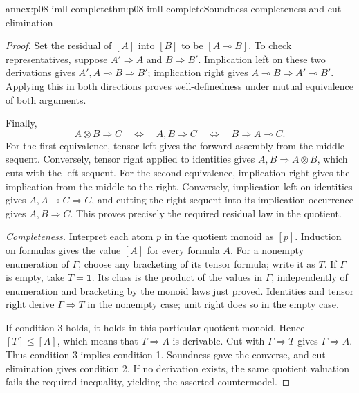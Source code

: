 \begin{annexitem}{annex:p08-imll-complete}{thm:p08-imll-complete}{Soundness completeness and cut elimination}
\begin{proof}
Set the residual of \([A]\) into \([B]\) to be
\([A\multimap B]\).
To check representatives, suppose \(A'\Rightarrow A\) and
\(B\Rightarrow B'\). Implication left on these two derivations gives
\(A',A\multimap B\Rightarrow B'\); implication right gives
\(A\multimap B\Rightarrow A'\multimap B'\).
Applying this in both directions proves well-definedness under
mutual equivalence of both arguments.

Finally,
\[
 A\otimes B\Rightarrow C
 \quad\Longleftrightarrow\quad
 A,B\Rightarrow C
 \quad\Longleftrightarrow\quad
 B\Rightarrow A\multimap C.
\]
For the first equivalence, tensor left gives the forward
assembly from the middle sequent. Conversely, tensor right applied
to identities gives \(A,B\Rightarrow A\otimes B\), which cuts
with the left sequent. For the second equivalence, implication
right gives the implication from the middle to the right.
Conversely, implication left on identities gives
\(A,A\multimap C\Rightarrow C\), and cutting the right sequent
into its implication occurrence gives \(A,B\Rightarrow C\).
This proves precisely the required residual law in the quotient.

\emph{Completeness.}
Interpret each atom \(p\) in the quotient monoid as \([p]\).
Induction on formulas gives the value \([A]\) for every formula \(A\).
For a nonempty enumeration of \(\Gamma\), choose any bracketing of
its tensor formula; write it as \(T\). If \(\Gamma\) is empty,
take \(T=\mathbf1\).
Its class is the product of the values in \(\Gamma\), independently
of enumeration and bracketing by the monoid laws just proved.
Identities and tensor right derive \(\Gamma\Rightarrow T\)
in the nonempty case; unit right does so in the empty case.

If condition 3 holds, it holds in this particular quotient monoid.
Hence \([T]\leq[A]\), which means that \(T\Rightarrow A\) is
derivable. Cut with \(\Gamma\Rightarrow T\) gives
\(\Gamma\Rightarrow A\). Thus condition 3 implies condition 1.
Soundness gave the converse, and cut elimination gives condition 2.
If no derivation exists, the same quotient valuation fails the
required inequality, yielding the asserted countermodel.
\end{proof}
\end{annexitem}

